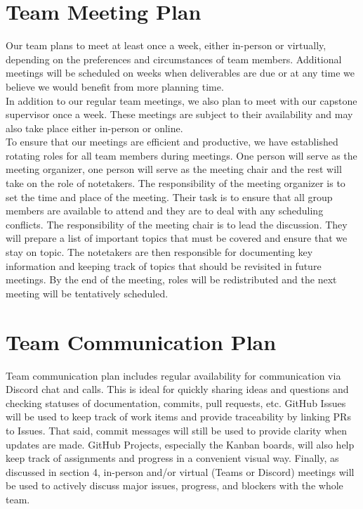 \documentclass{article}
\begin{document}

\section{Team Meeting Plan}

Our team plans to meet at least once a week, either in-person or virtually, depending on the preferences and circumstances of team members. Additional meetings will be scheduled on weeks when deliverables are due or at any time we believe we would benefit from more planning time.\\

In addition to our regular team meetings, we also plan to meet with our capstone supervisor once a week. These meetings are subject to their availability and may also take place either in-person or online.\\

To ensure that our meetings are efficient and productive, we have established rotating roles for all team members during meetings. One person will serve as the meeting organizer, one person will serve as the meeting chair and the rest will take on the role of notetakers. The responsibility of the meeting organizer is to set the time and place of the meeting. Their task is to ensure that all group members are available to attend and they are to deal with any scheduling conflicts. The responsibility of the meeting chair is to lead the discussion. They will prepare a list of important topics that must be covered and ensure that we stay on topic. The notetakers are then responsible for documenting key information and keeping track of topics that should be revisited in future meetings. By the end of the meeting, roles will be redistributed and the next meeting will be tentatively scheduled.

\section{Team Communication Plan}

Team communication plan includes regular availability for communication via Discord chat and calls. This is ideal for quickly sharing ideas and questions and checking statuses of documentation, commits, pull requests, etc. GitHub Issues will be used to keep track of work items and provide traceability by linking PRs to Issues. That said, commit messages will still be used to provide clarity when updates are made. GitHub Projects, especially the Kanban boards, will also help keep track of assignments and progress in a convenient visual way. Finally, as discussed in section 4, in-person and/or virtual (Teams or Discord) meetings will be used to actively discuss major issues, progress, and blockers with the whole team.
\end{document}
